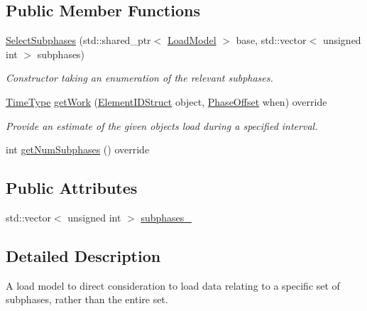 \subsection*{Public Member Functions}
\begin{DoxyCompactItemize}
\item 
\hyperlink{classvt_1_1vrt_1_1collection_1_1balance_1_1_select_subphases_a6eeee8aa0dce1a0483549835006a0bed}{Select\+Subphases} (std\+::shared\+\_\+ptr$<$ \hyperlink{structvt_1_1vrt_1_1collection_1_1balance_1_1_load_model}{Load\+Model} $>$ base, std\+::vector$<$ unsigned int $>$ subphases)
\begin{DoxyCompactList}\small\item\em Constructor taking an enumeration of the relevant subphases. \end{DoxyCompactList}\item 
\hyperlink{namespacevt_a876a9d0cd5a952859c72de8a46881442}{Time\+Type} \hyperlink{classvt_1_1vrt_1_1collection_1_1balance_1_1_select_subphases_a77cf76f7699c9480483cb4104bf58965}{get\+Work} (\hyperlink{namespacevt_1_1vrt_1_1collection_1_1balance_a9f5b53fafb270212279a4757d2c4cd28}{Element\+I\+D\+Struct} object, \hyperlink{structvt_1_1vrt_1_1collection_1_1balance_1_1_phase_offset}{Phase\+Offset} when) override
\begin{DoxyCompactList}\small\item\em Provide an estimate of the given object\textquotesingle{}s load during a specified interval. \end{DoxyCompactList}\item 
int \hyperlink{classvt_1_1vrt_1_1collection_1_1balance_1_1_select_subphases_a347673e0bbc4ded04f32d97fea8f5b68}{get\+Num\+Subphases} () override
\end{DoxyCompactItemize}
\subsection*{Public Attributes}
\begin{DoxyCompactItemize}
\item 
std\+::vector$<$ unsigned int $>$ \hyperlink{classvt_1_1vrt_1_1collection_1_1balance_1_1_select_subphases_ad9ad62b67851546a4377ee6a4e17181e}{subphases\+\_\+}
\end{DoxyCompactItemize}


\subsection{Detailed Description}
A load model to direct consideration to load data relating to a specific set of subphases, rather than the entire set. 

